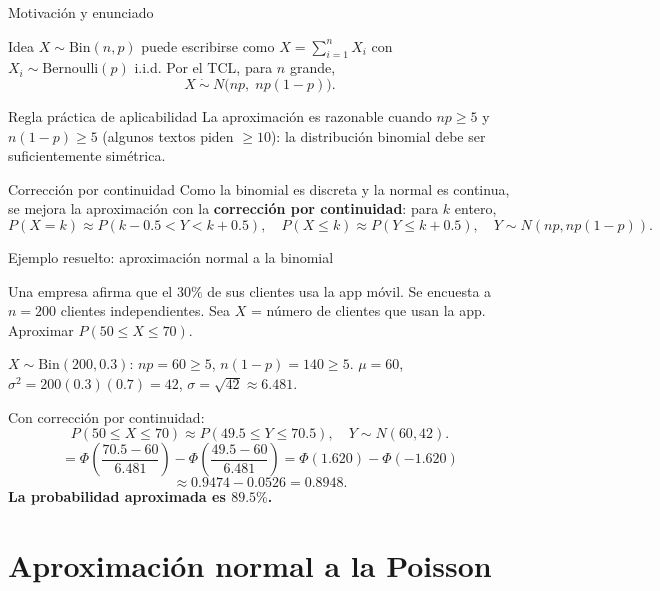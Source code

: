 \documentclass[aspectratio=169,11pt]{beamer}
\begin{document}
\begin{frame}{Motivación y enunciado}
\begin{block}{Idea}
$X \sim \text{Bin}(n,p)$ puede escribirse como $X = \sum_{i=1}^n X_i$ con $X_i \sim \text{Bernoulli}(p)$ i.i.d. Por el TCL, para $n$ grande,
\[
X \ \dot\sim\ N\big(np,\; np(1-p)\big).
\]
\end{block}

\begin{alertblock}{Regla práctica de aplicabilidad}
La aproximación es razonable cuando $np \geq 5$ y $n(1-p)\geq 5$ (algunos textos piden $\geq 10$): la distribución binomial debe ser suficientemente simétrica.
\end{alertblock}

\begin{block}{Corrección por continuidad}
Como la binomial es discreta y la normal es continua, se mejora la aproximación con la \textbf{corrección por continuidad}: para $k$ entero,
\[
P(X = k) \approx P(k-0.5 < Y < k+0.5), \quad P(X\leq k)\approx P(Y \leq k+0.5), \quad Y\sim N(np,np(1-p)).
\]
\end{block}
\end{frame}

\begin{frame}{Ejemplo resuelto: aproximación normal a la binomial}
\begin{example}
Una empresa afirma que el $30\%$ de sus clientes usa la app móvil. Se encuesta a $n=200$ clientes independientes. Sea $X$ = número de clientes que usan la app. Aproximar $P(50 \leq X \leq 70)$.
\end{example}

\medskip
$X\sim\text{Bin}(200, 0.3)$: $np=60\geq 5$, $n(1-p)=140\geq 5$. $\mu = 60$, $\sigma^2 = 200(0.3)(0.7)=42$, $\sigma=\sqrt{42}\approx 6.481$.

Con corrección por continuidad:
\[
P(50\leq X\leq 70) \approx P(49.5 \leq Y \leq 70.5), \quad Y\sim N(60,42).
\]
\[
= \Phi\!\left(\frac{70.5-60}{6.481}\right) - \Phi\!\left(\frac{49.5-60}{6.481}\right) = \Phi(1.620) - \Phi(-1.620)
\]
\[
\approx 0.9474 - 0.0526 = 0.8948.
\]
\textbf{La probabilidad aproximada es $89.5\%$.}
\end{frame}

\section{Aproximación normal a la Poisson}
\end{document}

